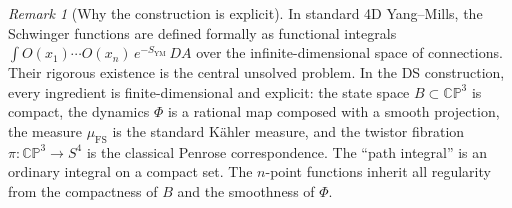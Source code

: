 \documentclass[11pt,a4paper]{article}
\theoremstyle{definition}
\theoremstyle{remark}
\newtheorem{remark}[theorem]{Remark}
\newcommand{\CP}{\mathbb{CP}}
\begin{document}
\begin{remark}[Why the construction is explicit]
In standard 4D Yang--Mills, the Schwinger functions are defined formally as functional integrals $\int O(x_1)\cdots O(x_n)\,e^{-S_{\mathrm{YM}}}\,DA$ over the infinite-dimensional space of connections. Their rigorous existence is the central unsolved problem. In the DS construction, every ingredient is finite-dimensional and explicit: the state space $B\subset\CP^3$ is compact, the dynamics $\Phi$ is a rational map composed with a smooth projection, the measure $\mu_{\mathrm{FS}}$ is the standard K\"ahler measure, and the twistor fibration $\pi:\CP^3\to S^4$ is the classical Penrose correspondence. The ``path integral'' is an ordinary integral on a compact set. The $n$-point functions inherit all regularity from the compactness of $B$ and the smoothness of $\Phi$.
\end{remark}
\end{document}
